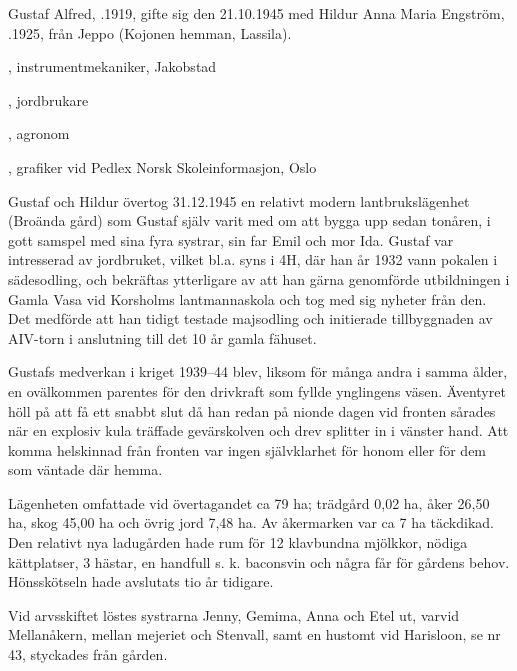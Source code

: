 %
Gustaf Alfred, .1919, gifte sig den 21.10.1945 med Hildur Anna Maria Engström, .1925, från Jeppo (Kojonen hemman, Lassila).
\begin{jhchildren}
  \item {}, instrumentmekaniker, Jakobstad
  \item {}, jordbrukare
  \item {}, agronom
  \item {}, grafiker vid Pedlex Norsk Skoleinformasjon, Oslo
\end{jhchildren}
Gustaf och Hildur övertog 31.12.1945 en relativt modern lantbrukslägenhet (Broända gård) som Gustaf själv varit med om att bygga upp sedan tonåren, i gott samspel med sina fyra systrar, sin far Emil och mor Ida. Gustaf var intresserad av jordbruket, vilket bl.a. syns i 4H, där han år 1932 vann pokalen i sädesodling, och bekräftas ytterligare av att han gärna genomförde utbildningen i Gamla Vasa vid Korsholms lantmannaskola och tog med sig nyheter från den. Det medförde att han tidigt testade majsodling och initierade tillbyggnaden av AIV-torn i anslutning till det 10 år gamla fähuset.

Gustafs medverkan i kriget 1939--44 blev, liksom för många andra i samma ålder, en ovälkommen parentes för den drivkraft som fyllde ynglingens väsen. Äventyret höll på att få ett snabbt slut då han redan på nionde dagen vid fronten sårades när en explosiv kula träffade gevärskolven och drev splitter in i vänster hand. Att komma helskinnad från fronten var ingen självklarhet för honom eller för dem som väntade där hemma.

Lägenheten omfattade vid övertagandet ca 79 ha; trädgård 0,02 ha, åker 26,50 ha, skog 45,00 ha och övrig jord 7,48 ha. Av åkermarken var ca 7 ha täckdikad. Den relativt nya ladugården hade rum för 12 klavbundna mjölkkor, nödiga kättplatser, 3 hästar, en handfull s. k. baconsvin och några får för gårdens behov. Hönsskötseln hade avslutats tio år tidigare.

Vid arvsskiftet löstes systrarna Jenny, Gemima, Anna och Etel ut, varvid Mellanåkern, mellan mejeriet och Stenvall, samt en hustomt vid Harisloon, se nr 43, styckades från gården.

